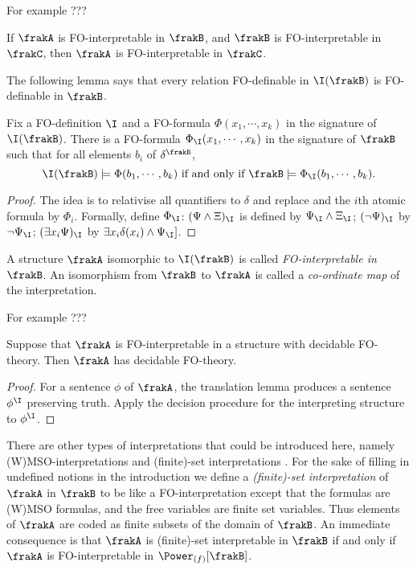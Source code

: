 For example ???

\begin{proposition} \label{AS:prop:compose}
If $\frakA$ is FO-interpretable in $\frakB$, and $\frakB$ is FO-interpretable in $\frakC$, then $\frakA$ is FO-interpretable in $\frakC$.
\end{proposition}

The following lemma says that every relation FO-definable in $\I(\frakB)$ is FO-definable in $\frakB$.

\begin{lemma} 
Fix a FO-definition $\I$ and a FO-formula $\Phi(x_1,\cdots,x_k)$ in the signature of $\I(\frakB)$.
There is a FO-formula $\Phi_\I(x_1,\cdots,x_k)$ in the signature of $\frakB$ such that for all elements $b_i$ of $\delta^\frakB$,
\[
\I(\frakB) \models \Phi(b_1,\cdots,b_k) \mbox{ if and only if } \frakB \models \Phi_\I(b_1,\cdots,b_k).
\]
\end{lemma}

\begin{proof}
The idea is to relativise all quantifiers to $\delta$ and replace and the $i$th atomic formula by $\Phi_i$.
Formally, define $\Phi_\I$: $(\Psi \wedge \Xi)_\I$ is defined by $\Psi_\I
\wedge \Xi_\I$; $(\neg \Psi)_\I$ by $\neg \Psi_\I$; $(\exists x_i \Psi)_\I$ by
$\exists x_i \delta(x_i) \wedge \Psi_\I]$.
\end{proof}


A structure $\frakA$ isomorphic to $\I(\frakB)$ is called {\em FO-interpretable in $\frakB$}.
An isomorphism from $\frakB$ to $\frakA$ is called a {\em co-ordinate map} of the interpretation. 

For example ???


\begin{proposition}
Suppose that $\frakA$ is FO-interpretable in a structure with decidable FO-theory. Then $\frakA$ has decidable FO-theory.
\end{proposition}

\begin{proof}
For a sentence $\phi$ of $\frakA$, the translation lemma produces a sentence $\phi^\I$ preserving truth. Apply the decision procedure for the interpreting structure to $\phi^\I$. \end{proof}

There are other types of interpretations that could be introduced here, namely
(W)MSO-interpretations and (finite)-set interpretations \cite{}.  For the sake
of filling in undefined notions in the introduction we define a {\em (finite)-set
interpretation} of $\frakA$ in $\frakB$ to be like a FO-interpretation except
that the formulas are (W)MSO formulas, and the free variables are finite set
variables. Thus elements of $\frakA$ are coded as finite subsets of the domain
of $\frakB$. An immediate consequence is that $\frakA$ is (finite)-set
interpretable in $\frakB$ if and only if $\frakA$ is FO-interpretable in
$\Power_{(f)}[\frakB]$.

